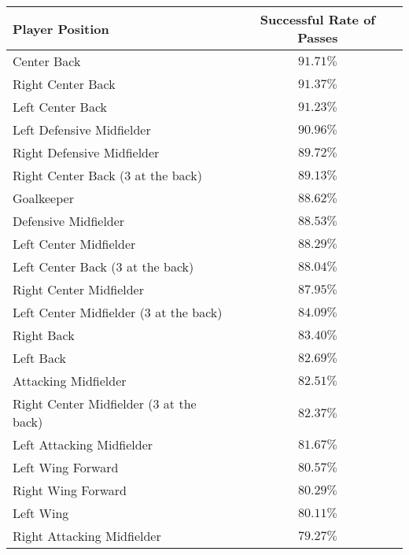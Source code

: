 \begin{table}[!htbp]
\centering
\begin{tabular}{l|c}
Player Position                         & Successful Rate of Passes \\
\hline
Center Back                             & $91.71\%$                   \\
Right Center Back                       & $91.37\%$                 \\
Left Center Back                        & $91.23\%$                   \\
Left Defensive Midfielder               & $90.96\%$                   \\
Right Defensive Midfielder              & $89.72\%$                   \\
Right Center Back (3 at the back)       & $89.13\%$                   \\
Goalkeeper                              & $88.62\%$                   \\
Defensive Midfielder                    & $88.53\%$                   \\
Left Center Midfielder                  & $88.29\%$                   \\
Left Center Back (3 at the back)        & $88.04\%$                   \\
Right Center Midfielder                 & $87.95\%$                   \\
Left Center Midfielder (3 at the back)  & $84.09\%$                   \\
Right Back                              & $83.40\%$                   \\
Left Back                               & $82.69\%$                  \\
Attacking Midfielder                    & $82.51\%$                   \\
Right Center Midfielder (3 at the back) & $82.37\%$                   \\
Left Attacking Midfielder               & $81.67\%$                   \\
Left Wing Forward                       & $80.57\%$                   \\
Right Wing Forward                      & $80.29\%$                   \\
Left Wing                               & $80.11\%$                   \\
Right Attacking Midfielder              & $79.27\%$                   \\

\end{tabular}
\end{table}

